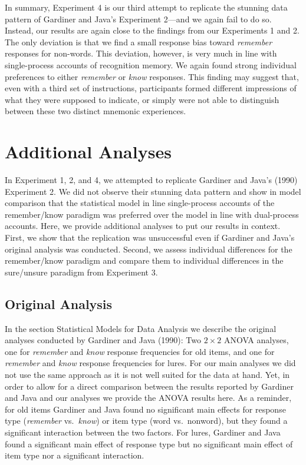 \documentclass[english,,man,floatsintext]{apa6}
\begin{document}
In summary, Experiment 4 is our third attempt to replicate the stunning data pattern of Gardiner and Java's Experiment 2---and we again fail to do so. Instead, our results are again close to the findings from our Experiments 1 and 2. The only deviation is that we find a small response bias toward \emph{remember} responses for non-words. This deviation, however, is very much in line with single-process accounts of recognition memory. We again found strong individual preferences to either \emph{remember} or \emph{know} responses. This finding may suggest that, even with a third set of instructions, participants formed different impressions of what they were supposed to indicate, or simply were not able to distinguish between these two distinct mnemonic experiences.

\hypertarget{additional-analyses}{%
\section{Additional Analyses}\label{additional-analyses}}

In Experiment 1, 2, and 4, we attempted to replicate Gardiner and Java's (1990) Experiment 2. We did not observe their stunning data pattern and show in model comparison that the statistical model in line single-process accounts of the remember/know paradigm was preferred over the model in line with dual-process accounts. Here, we provide additional analyses to put our results in context. First, we show that the replication was unsuccessful even if Gardiner and Java's original analysis was conducted. Second, we assess individual differences for the remember/know paradigm and compare them to individual differences in the sure/unsure paradigm from Experiment 3.

\hypertarget{original-analysis}{%
\subsection{Original Analysis}\label{original-analysis}}

In the section Statistical Models for Data Analysis we describe the original analyses conducted by Gardiner and Java (1990): Two \(2\times 2\) ANOVA analyses, one for \emph{remember} and \emph{know} response frequencies for old items, and one for \emph{remember} and \emph{know} response frequencies for lures. For our main analyses we did not use the same approach as it is not well suited for the data at hand. Yet, in order to allow for a direct comparison between the results reported by Gardiner and Java and our analyses we provide the ANOVA results here. As a reminder, for old items Gardiner and Java found no significant main effects for response type (\emph{remember} vs.~\emph{know}) or item type (word vs.~nonword), but they found a significant interaction between the two factors. For lures, Gardiner and Java found a significant main effect of response type but no significant main effect of item type nor a significant interaction.
\end{document}
